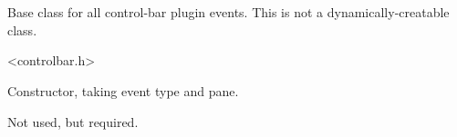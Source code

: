 %
%


\section{}\label{cbpluginevent}


Base class for all control-bar plugin events.
This is not a dynamically-creatable class.




<controlbar.h>




\label{cbplugineventcbpluginevent}


Constructor, taking event type and pane.


\label{cbplugineventclone}


Not used, but required.

